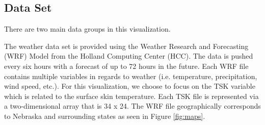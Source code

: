 \documentclass[journal]{vgtc}                %
\begin{document}
\subsection{Data Set}
\label{sec:dataset}

There are two main data groups in this visualization. 

The weather data set is provided using the Weather Research and Forecasting (WRF) Model from the Holland Computing Center (HCC). The data is pushed every six hours with a forecast of up to 72 hours in the future. Each WRF file contains multiple variables in regards to weather (i.e. temperature, precipitation, wind speed, etc.). For this visualization, we choose to focus on the TSK variable which is related to the surface skin temperature. Each TSK file is represented via a two-dimensional array that is 34 x 24. The WRF file geographically corresponds to Nebraska and surrounding states as seen in Figure \ref{fig:maps}.
\end{document}

